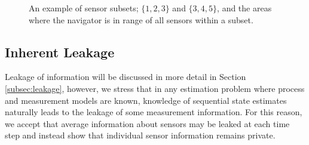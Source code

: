 \documentclass[twocolumn]{autart}
\begin{document}
\begin{figure}[htbp]
\caption{An example of sensor subsets; $\{1,2,3\}$ and $\{3,4,5\}$, and the areas where the navigator is in range of all sensors within a subset.}
\label{fig:sensor_subsets}
\end{figure}

% 
% 

\subsection{Inherent Leakage}
Leakage of information will be discussed in more detail in Section \ref{subsec:leakage}, however, we stress that in any estimation problem where process and measurement models are known, knowledge of sequential state estimates naturally leads to the leakage of some measurement information. For this reason, we accept that average information about sensors may be leaked at each time step and instead show that individual sensor information remains private.

% 
% 
\end{document}
